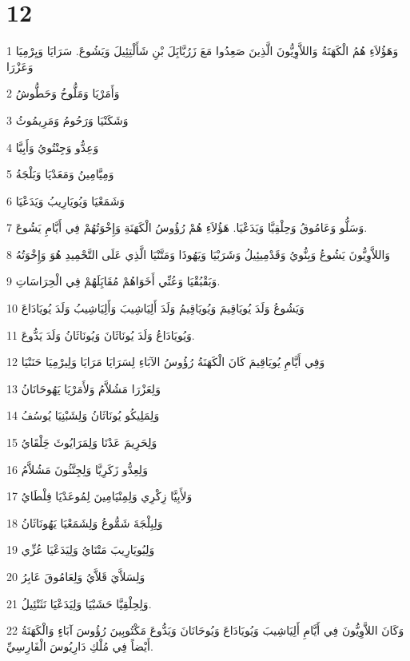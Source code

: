 \chapter{12}

\par 1 وَهَؤُلاَءِ هُمُ الْكَهَنَةُ وَاللاَّوِيُّونَ الَّذِينَ صَعِدُوا مَعَ زَرُبَّابَِلَ بْنِ شَأَلْتِئِيلَ وَيَشُوعَ. سَرَايَا وَيِرْمِيَا وَعَزْرَا
\par 2 وَأَمَرْيَا وَمَلُّوخُ وَحَطُّوشُ
\par 3 وَشَكَنْيَا وَرَحُومُ وَمَرِيمُوثُ
\par 4 وَعِدُّو وَجِنْتُويُ وَأَبِيَّا
\par 5 وَمِيَّامِينُ وَمَعَدْيَا وَبَلْجَةُ
\par 6 وَشَمَعْيَا وَيُويَارِيبُ وَيَدَعْيَا
\par 7 وَسَلُّو وَعَامُوقُ وَحِلْقِيَّا وَيَدَعْيَا. هَؤُلاَءِ هُمْ رُؤُوسُ الْكَهَنَةِ وَإِخْوَتُهُمْ فِي أَيَّامِ يَشُوعَ.
\par 8 وَاللاَّوِيُّونَ يَشُوعُ وَبِنُّويُ وَقَدْمِيئِيلُ وَشَرَبْيَا وَيَهُوذَا وَمَتَّنْيَا الَّذِي عَلَى التَّحْمِيدِ هُوَ وَإِخْوَتُهُ
\par 9 وَبَقْبُقْيَا وَعُنِّي أَخَوَاهُمْ مُقَابَِلَهُمْ فِي الْحِرَاسَاتِ.
\par 10 وَيَشُوعُ وَلَدَ يُويَاقِيمَ وَيُويَاقِيمُ وَلَدَ أَلِيَاشِيبَ وَأَلِيَاشِيبُ وَلَدَ يُويَادَاعَ
\par 11 وَيُويَادَاعُ وَلَدَ يُونَاثَانَ وَيُونَاثَانُ وَلَدَ يَدُّوعَ.
\par 12 وَفِي أَيَّامِ يُويَاقِيمَ كَانَ الْكَهَنَةُ رُؤُوسُ الآبَاءِ لِسَرَايَا مَرَايَا وَلِيرْمِيَا حَنَنْيَا
\par 13 وَلِعَزْرَا مَشُلاَّمُ وَلأَمَرْيَا يَهُوحَانَانُ
\par 14 وَلِمَلِيكُو يُونَاثَانُ وَلِشَبْنِيَا يُوسُفُ
\par 15 وَلِحَرِيمَ عَدْنَا وَلِمَرَايُوثَ حَِلْقَايُ
\par 16 وَلِعِدُّو زَكَرِيَّا وَلِجِنَّثُونَ مَشُلاَّمُ
\par 17 وَلأَبِيَّا زِكْرِي وَلِمِنْيَامِينَ لِمُوعَدْيَا فِلْطَايُ
\par 18 وَلِبِلْجَةَ شَمُّوعُ وَلِشَمَعْيَا يَهُونَاثَانُ
\par 19 وَلِيُويَارِيبَ مَتْنَايُ وَلِيَدَعْيَا عُزِّي
\par 20 وَلِسَلاَّيَ قَلاَّيُ وَلِعَامُوقَ عَابِرُ
\par 21 وَلِحِلْقِيَّا حَشَبْيَا وَلِيَدَعْيَا نَثَنْئِيلُ.
\par 22 وَكَانَ اللاَّوِيُّونَ فِي أَيَّامِ أَلِيَاشِيبَ وَيُويَادَاعَ وَيُوحَانَانَ وَيَدُّوعَ مَكْتُوبِينَ رُؤُوسَ آبَاءٍ وَالْكَهَنَةُ أَيْضاً فِي مُلْكِ دَارِيُوسَ الْفَارِسِيِّ.
